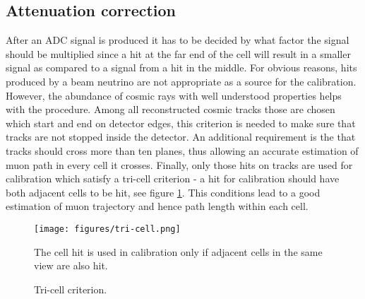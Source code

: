 \subsection{Attenuation correction}
After an ADC signal is produced it has to be decided by what factor the signal should be multiplied since a hit at
the far end of the cell will result in a smaller signal as compared to a signal from a hit in the middle. 
For obvious reasons, hits produced by a beam neutrino are not appropriate as a source for the calibration. However,
the abundance of cosmic rays with well understood properties helps with the procedure. Among all reconstructed 
cosmic tracks those are chosen which start and end on detector edges, this criterion is needed to make sure
that tracks are not stopped inside the detector. An additional requirement is the that tracks should cross more than
ten planes, thus allowing an accurate estimation of muon path in every cell it crosses. Finally, only those 
hits on tracks are used for calibration which satisfy a tri-cell criterion - a hit for calibration should
have both adjacent cells to be hit, see figure \ref{fig:tri-cell}. This conditions lead to a good estimation 
of muon trajectory and hence path length within each cell.
\begin{figure}[h]
\centering
\texttt{[image: figures/tri-cell.png]}
\caption{Tri-cell criterion.}
{The cell hit is used in calibration only if adjacent cells in the same view are also hit.}
\label{fig:tri-cell}
\end{figure}


